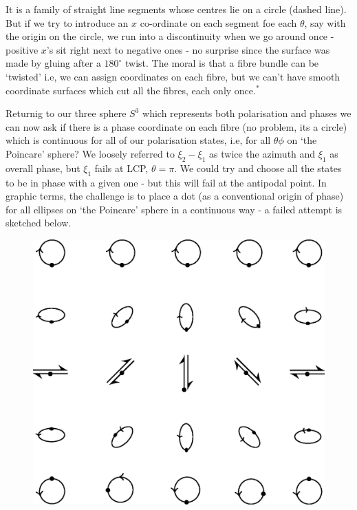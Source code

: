 It is a family of straight line segments whose centres lie on a circle (dashed
line). But if we try to introduce an $x$ co-ordinate on each segment foe each $\theta$,
say with the origin on the circle, we run into a discontinuity when we go around
once - positive $x$'s sit right next to negative ones - no surprise since the surface
was made by gluing after a $180^{\circ}$ twist. The moral is that a fibre bundle can
be `twisted' i.e, we can assign coordinates on each fibre, but we can't have smooth
coordinate surfaces which cut all the fibres, each only once.$^{\ast}$

Returnig to our three sphere $S^3$ which represents both polarisation and
phases we can now ask if there is a phase coordinate on each fibre (no problem,
its a circle) which is continuous for all of our polarisation states, i.e, for all $\theta \phi$
on `the Poincare' sphere? We loosely referred to $\xi_2 - \xi_1$ as twice the azimuth and
$\xi_1$ as overall phase, but $\xi_1$ fails at LCP, $\theta = \pi$. We could try and choose all the
states to be in phase with a given one - but this will fail at the antipodal point.
In graphic terms, the challenge is to place a dot (as a conventional origin of phase)
for all ellipses on `the Poincare' sphere in a continuous way - a failed attempt is
sketched below.
\bigskip

\begin{figure}[H]
\centering
\includegraphics[scale=0.22]{src/images/chap26/18.jpg}
\end{figure}
\bigskip

